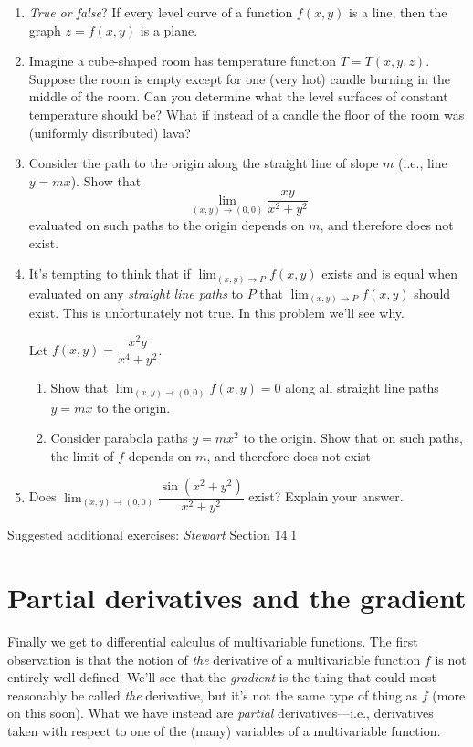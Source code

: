 \documentclass[12pt]{article}
\numberwithin{equation}{subsection}
\numberwithin{figure}{subsection}
\theoremstyle{note}
\begin{document}
{\begin{enumerate}[label=\arabic*.]
\item \textit{True or false}? If every level curve of a function $f(x,y)$ is a line, then the graph $z=f(x,y)$ is a plane. 

\item Imagine a cube-shaped room has temperature function $T=T(x,y,z)$. Suppose the room is empty except for one (very hot) candle burning in the middle of the room. Can you determine what the level surfaces of constant temperature should be? What if instead of a candle the floor of the room was (uniformly distributed) lava? 

\item Consider the path to the origin along the straight line of slope $m$ (i.e., line $y=mx$). Show that \[ \lim_{(x,y)\to(0,0) }\dfrac{xy}{x^2+y^2}\] evaluated on such paths to the origin depends on $m$, and therefore does not exist.

\item It's tempting to think that if $\lim_{(x,y)\to P}f(x,y)$ exists and is equal when evaluated on any \textit{straight line paths} to $P$ that $\lim_{(x,y)\to P}f(x,y)$ should exist. This is unfortunately not true. In this problem we'll see why. 

Let $f(x,y)=\dfrac{x^2y}{x^4+y^2}$. 
\begin{enumerate}
	\item Show that $\displaystyle \lim_{(x,y)\to (0,0)}f(x,y)=0$ along all straight line paths $y=mx$ to the origin. 
	\item Consider parabola paths $y=mx^2$ to the origin. Show that on such paths, the limit of $f$ depends on $m$, and therefore does not exist
\end{enumerate}

\item Does $\displaystyle \lim_{(x,y)\to (0,0)} \dfrac{\sin(x^2+y^2)}{x^2+y^2}$ exist? Explain your answer.
\end{enumerate}



Suggested additional exercises: \textit{Stewart} Section 14.1


\section{Partial derivatives and the gradient}

Finally we get to differential calculus of multivariable functions. The first observation is that the notion of \textit{the} derivative of a multivariable function $f$ is not entirely well-defined. We'll see that the \textit{gradient} is the thing that could most reasonably be called \textit{the} derivative, but it's not the same type of thing as $f$ (more on this soon). What we have instead are \textit{partial} derivatives---i.e., derivatives taken with respect to one of the (many) variables of a multivariable function. 


}
\end{document}
